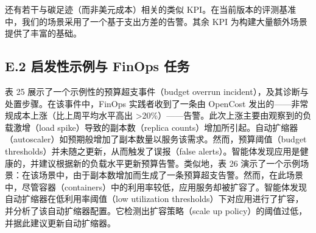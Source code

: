 还有若干与碳足迹（而非美元成本）相关的类似 KPI。在当前版本的评测基准中，我们的场景采用了一个基于支出方差的告警。其余 KPI 为构建大量额外场景提供了丰富的基础。

\subsection{E.2 启发性示例与 FinOps 任务}

表 25 展示了一个示例性的预算超支事件（budget overrun incident），及其诊断与处置步骤。在该事件中，FinOps 实践者收到了一条由 OpenCost 发出的——非常规成本上涨（比上周平均水平高出 >20\%）——告警。此次上涨主要由观察到的负载激增（load spike）导致的副本数（replica counts）增加所引起。自动扩缩器（autoscaler）如预期般增加了副本数量以服务该需求。然而，预算阈值（budget thresholds）并未随之更新，从而触发了误报（false alerts）。智能体发现应用是健康的，并建议根据新的负载水平更新预算告警。类似地，表 26 演示了一个示例场景：在该场景中，由于副本数增加而生成了一条预算超支告警。然而，在此场景中，尽管容器（containers）中的利用率较低，应用服务却被扩容了。智能体发现自动扩缩器在低利用率阈值（low utilization thresholds）下对应用进行了扩容，并分析了该自动扩缩器配置。它检测出扩容策略（scale up policy）的阈值过低，并据此建议更新自动扩缩器。

